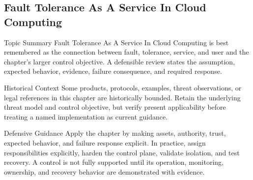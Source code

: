 \documentclass[11pt,letterpaper]{article}
\begin{document}
\subsection*{Fault Tolerance As A Service In Cloud Computing}
\begin{CornellNotesTable}
\end{CornellNotesTable}
\begin{CornellSummaryBox}{Topic Summary}
Fault Tolerance As A Service In Cloud Computing is best remembered as the connection between fault, tolerance, service, and user and the chapter's larger control objective. A defensible review states the assumption, expected behavior, evidence, failure consequence, and required response.
\end{CornellSummaryBox}
\begin{CornellWarningBox}{Historical Context}
Some products, protocols, examples, threat observations, or legal references in this chapter are historically bounded. Retain the underlying threat model and control objective, but verify present applicability before treating a named implementation as current guidance.
\end{CornellWarningBox}
\begin{CornellOverviewBox}{Defensive Guidance}
Apply the chapter by making assets, authority, trust, expected behavior, and failure response explicit. In practice, assign responsibilities explicitly, harden the control plane, validate isolation, and test recovery. A control is not fully supported until its operation, monitoring, ownership, and recovery behavior are demonstrated with evidence.
\end{CornellOverviewBox}
\end{document}
